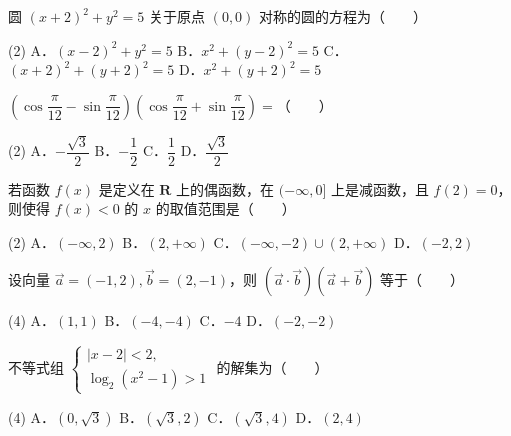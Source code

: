 

\begin{question}
圆 $(x + 2)^2 + y^2 = 5$ 关于原点 $(0, 0)$ 对称的圆的方程为\mbox{（　　）}

\begin{gkopts}(2)
\task A．$(x - 2)^2 + y^2 = 5$
\task B．$x^2 + (y - 2)^2 = 5$
\task C．$(x + 2)^2 + (y + 2)^2 = 5$
\task D．$x^2 + (y + 2)^2 = 5$
\end{gkopts}

\end{question}
\begin{question}
$\left(\cos\dfrac{\pi}{12} - \sin\dfrac{\pi}{12}\right)\left(\cos\dfrac{\pi}{12} + \sin\dfrac{\pi}{12}\right) =$\mbox{（　　）}

\begin{gkopts}(2)
\task A．$-\dfrac{\sqrt{3}}{2}$
\task B．$-\dfrac{1}{2}$
\task C．$\dfrac{1}{2}$
\task D．$\dfrac{\sqrt{3}}{2}$
\end{gkopts}

\end{question}
\begin{question}
若函数 $f(x)$ 是定义在 $\mathbf{R}$ 上的偶函数，在 $(-\infty, 0]$ 上是减函数，且 $f(2) = 0$，则使得 $f(x) < 0$ 的 $x$ 的取值范围是\mbox{（　　）}

\begin{gkopts}(2)
\task A．$(-\infty, 2)$
\task B．$(2, +\infty)$
\task C．$(-\infty, -2) \cup (2, +\infty)$
\task D．$(-2, 2)$
\end{gkopts}

\end{question}
\begin{question}
设向量 $\vec{a} = (-1, 2), \vec{b} = (2, -1)$，则 $(\vec{a} \cdot \vec{b})(\vec{a} + \vec{b})$ 等于\mbox{（　　）}

\begin{gkopts}(4)
\task A．$(1, 1)$
\task B．$(-4, -4)$
\task C．$-4$
\task D．$(-2, -2)$
\end{gkopts}

\end{question}
\begin{question}
不等式组 $\begin{cases} |x - 2| < 2, \\ \log_2(x^2 - 1) > 1 \end{cases}$ 的解集为\mbox{（　　）}

\begin{gkopts}(4)
\task A．$(0, \sqrt{3})$
\task B．$(\sqrt{3}, 2)$
\task C．$(\sqrt{3}, 4)$
\task D．$(2, 4)$
\end{gkopts}

\end{question}
